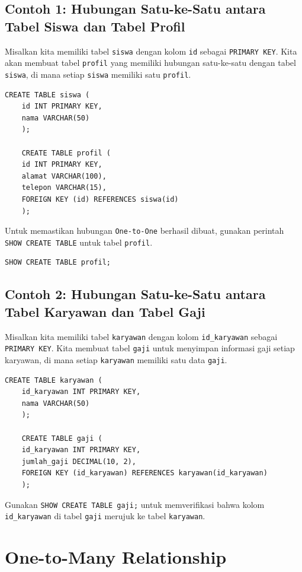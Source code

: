 \subsection*{Contoh 1: Hubungan Satu-ke-Satu antara Tabel Siswa dan Tabel Profil}
Misalkan kita memiliki tabel \texttt{siswa} dengan kolom \texttt{id} sebagai \texttt{PRIMARY KEY}. Kita akan membuat tabel \texttt{profil} yang memiliki hubungan satu-ke-satu dengan tabel \texttt{siswa}, di mana setiap \texttt{siswa} memiliki satu \texttt{profil}.

\begin{lstlisting}[style=sql]
	CREATE TABLE siswa (
	id INT PRIMARY KEY,
	nama VARCHAR(50)
	);
	
	CREATE TABLE profil (
	id INT PRIMARY KEY,
	alamat VARCHAR(100),
	telepon VARCHAR(15),
	FOREIGN KEY (id) REFERENCES siswa(id)
	);
\end{lstlisting}

Untuk memastikan hubungan \texttt{One-to-One} berhasil dibuat, gunakan perintah \texttt{SHOW CREATE TABLE} untuk tabel \texttt{profil}.

\begin{lstlisting}[style=sql]
	SHOW CREATE TABLE profil;
\end{lstlisting}

\subsection*{Contoh 2: Hubungan Satu-ke-Satu antara Tabel Karyawan dan Tabel Gaji}
Misalkan kita memiliki tabel \texttt{karyawan} dengan kolom \texttt{id\_karyawan} sebagai \texttt{PRIMARY KEY}. Kita membuat tabel \texttt{gaji} untuk menyimpan informasi gaji setiap karyawan, di mana setiap \texttt{karyawan} memiliki satu data \texttt{gaji}.

\begin{lstlisting}[style=sql]
	CREATE TABLE karyawan (
	id_karyawan INT PRIMARY KEY,
	nama VARCHAR(50)
	);
	
	CREATE TABLE gaji (
	id_karyawan INT PRIMARY KEY,
	jumlah_gaji DECIMAL(10, 2),
	FOREIGN KEY (id_karyawan) REFERENCES karyawan(id_karyawan)
	);
\end{lstlisting}

Gunakan \texttt{SHOW CREATE TABLE gaji;} untuk memverifikasi bahwa kolom \texttt{id\_karyawan} di tabel \texttt{gaji} merujuk ke tabel \texttt{karyawan}.

\section{One-to-Many Relationship}

